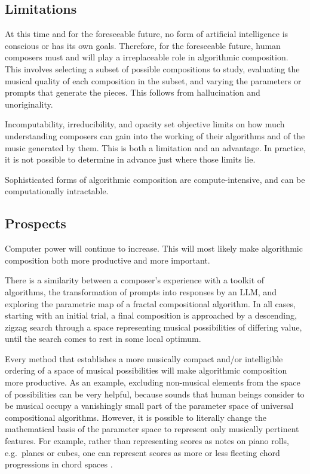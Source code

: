 \documentclass[11pt]{scrartcl}
\begin{document}
\subsection*{Limitations}

At this time and for the foreseeable future, no form of artificial intelligence is conscious or has its own goals. Therefore, for the foreseeable future, human composers must and will play a irreplaceable role in algorithmic composition. This involves selecting a subset of possible compositions to study, evaluating the musical quality of each composition in the subset, and varying the parameters or prompts that generate the pieces. This follows from hallucination and unoriginality.

Incomputability, irreducibility, and opacity set objective limits on how much understanding composers can gain into the working of their algorithms and of the music generated by them. This is both a limitation and an advantage. In practice, it is not possible to determine in advance just where those limits lie.

Sophisticated forms of algorithmic composition are compute-intensive, and can be computationally intractable.

\subsection*{Prospects}

Computer power will continue to increase. This will most likely make algorithmic composition both more productive and more important.

There is a similarity between a composer's experience with a toolkit of algorithms, the transformation of prompts into responses by an LLM, and exploring the parametric map of a fractal compositional algorithm. In all cases, starting with an initial trial, a final composition is approached by a descending, zigzag search through a space representing musical possibilities of differing value, until the search comes to rest in some local optimum.

Every method that establishes a more musically compact and/or intelligible ordering of a space of musical possibilities will make algorithmic composition more productive. As an example, excluding non-musical elements from the space of possibilities can be very helpful, because sounds that human beings consider to be musical occupy a vanishingly small part of the parameter space of universal compositional algorithms. However, it is possible to literally change the mathematical basis of the parameter space to represent only musically pertinent features. For example, rather than representing scores as notes on piano rolls, e.g.\ planes or cubes, one can represent scores as more or less fleeting chord progressions in chord spaces \parencite{gogins2006score, gogins2023scoregraphs}.
\end{document}
